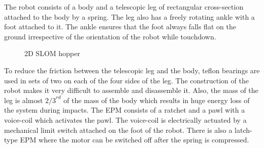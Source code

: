 The robot consists of a body and a telescopic leg of rectangular cross-section attached to the body by a spring. The leg also has a 
freely rotating ankle with a foot attached to it. The ankle ensures that the foot always falls flat on the ground irrespective of the 
orientation of the robot while touchdown.\\
\begin{figure}
\centering
{}
\hspace{1in}
\caption[2D SLOM hopper]{2D SLOM hopper \cite{saboo}}
\label{fig:2_saboo}
\end{figure}
To reduce the friction between the telescopic leg and the body, teflon bearings are used in sets of two on each of the four sides of 
the leg. The construction of the robot makes it very difficult to assemble and disassemble it. Also, the mass of the leg is almost 
${2/3}^{rd}$ of the mass of the body which results in huge energy loss of the system during impacts.
The EPM consists of a ratchet and a pawl with a voice-coil which activates the pawl. The voice-coil is electrically actuated by a 
mechanical limit switch attached on the foot of the robot. There is also a latch-type EPM where the motor can be switched off after 
the spring is compressed.\\

